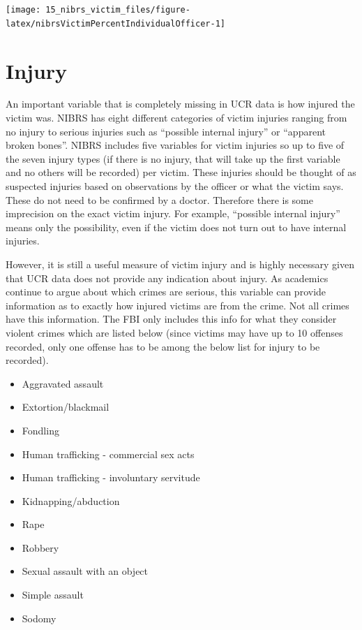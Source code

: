 \documentclass[
]{krantz}
\providecommand{\tightlist}{%
  \setlength{\itemsep}{0pt}\setlength{\parskip}{0pt}}
\let\origfigure\figure
\let\endorigfigure\endfigure
\renewenvironment{figure}[1][2] {
    \expandafter\origfigure\expandafter[H]
} {
    \endorigfigure
}
\begin{document}
\begin{figure}

{\centering \texttt{[image: 15\_nibrs\_victim\_files/figure-latex/nibrsVictimPercentIndividualOfficer-1]} 

}

\caption{Percent of victimizations whose victim type of 'law enforcement officer,' 'business,' or 'invidual,' 1991-2022.}\label{fig:nibrsVictimPercentIndividualOfficer}
\end{figure}

\section{Injury}\label{injury}

An important variable that is completely missing in UCR data
is how injured the victim was. NIBRS has eight different
categories of victim injuries ranging from no injury to
serious injuries such as ``possible internal injury'' or
``apparent broken bones''. NIBRS includes five variables for
victim injuries so up to five of the seven injury types (if
there is no injury, that will take up the first variable and
no others will be recorded) per victim. These injuries
should be thought of as suspected injuries based on
observations by the officer or what the victim says. These
do not need to be confirmed by a doctor. Therefore there is
some imprecision on the exact victim injury. For example,
``possible internal injury'' means only the possibility,
even if the victim does not turn out to have internal
injuries.

However, it is still a useful measure of victim injury and
is highly necessary given that UCR data does not provide any
indication about injury. As academics continue to argue
about which crimes are serious, this variable can provide
information as to exactly how injured victims are from the
crime. Not all crimes have this information. The FBI only
includes this info for what they consider violent crimes
which are listed below (since victims may have up to 10
offenses recorded, only one offense has to be among the
below list for injury to be recorded).

\begin{itemize}
\tightlist
\item
  Aggravated assault
\item
  Extortion/blackmail
\item
  Fondling
\item
  Human trafficking - commercial sex acts
\item
  Human trafficking - involuntary servitude
\item
  Kidnapping/abduction
\item
  Rape
\item
  Robbery
\item
  Sexual assault with an object
\item
  Simple assault
\item
  Sodomy
\end{itemize}
\end{document}
